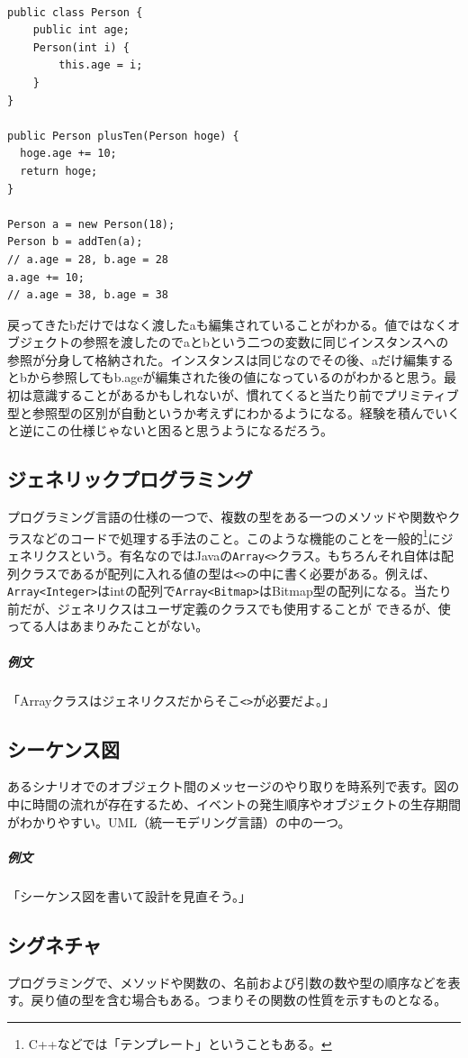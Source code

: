 \documentclass[dvipdfmx,jb5]{jreport}
\newcommand{\terlogy}[2][|]{\colorbox{terlogy}{\texttt{\lstinline#1#2#1}}}
\begin{document}
\lstset{language=Java}
\begin{lstlisting}

public class Person {
    public int age;
    Person(int i) {
        this.age = i;
    }
}

public Person plusTen(Person hoge) {
  hoge.age += 10;
  return hoge;
}

Person a = new Person(18);
Person b = addTen(a);
// a.age = 28, b.age = 28
a.age += 10;
// a.age = 38, b.age = 38
\end{lstlisting}
戻ってきたbだけではなく渡したaも編集されていることがわかる。値ではなくオブジェクトの参照を渡したのでaとbという二つの変数に同じインスタンスへの参照が分身して格納された。インスタンスは同じなのでその後、aだけ編集するとbから参照してもb.ageが編集された後の値になっているのがわかると思う。最初は意識することがあるかもしれないが、慣れてくると当たり前でプリミティブ型と参照型の区別が自動というか考えずにわかるようになる。経験を積んでいくと逆にこの仕様じゃないと困ると思うようになるだろう。

\subsection{ジェネリックプログラミング}
プログラミング言語の仕様の一つで、複数の型をある一つのメソッドや関数やクラスなどのコードで処理する手法のこと。このような機能のことを一般的\footnote{C++などでは「テンプレート」ということもある。}にジェネリクスという。有名なのではJavaの\terlogy{Array<>}クラス。もちろんそれ自体は配列クラスであるが配列に入れる値の型は\terlogy{<>}の中に書く必要がある。例えば、\terlogy{Array<Integer>}はintの配列で\terlogy{Array<Bitmap>}はBitmap型の配列になる。当たり前だが、ジェネリクスはユーザ定義のクラスでも使用することが
できるが、使ってる人はあまりみたことがない。

\subparagraph{例文} 「Arrayクラスはジェネリクスだからそこ\terlogy{<>}が必要だよ。」

\subsection{シーケンス図}
あるシナリオでのオブジェクト間のメッセージのやり取りを時系列で表す。図の中に時間の流れが存在するため、イベントの発生順序やオブジェクトの生存期間がわかりやすい。UML（統一モデリング言語）の中の一つ。

\subparagraph{例文} 「シーケンス図を書いて設計を見直そう。」

\subsection{シグネチャ}
プログラミングで、メソッドや関数の、名前および引数の数や型の順序などを表す。戻り値の型を含む場合もある。つまりその関数の性質を示すものとなる。
\end{document}
